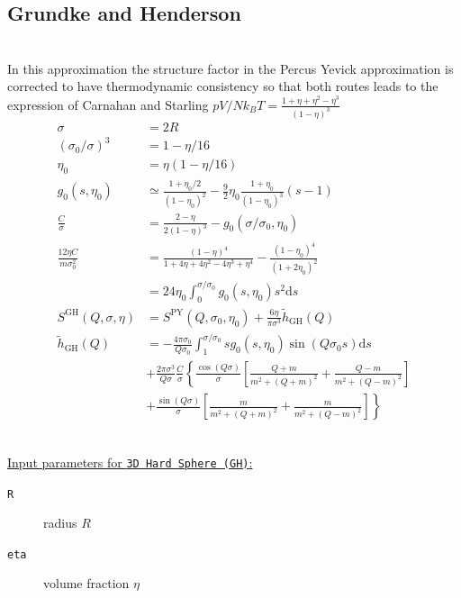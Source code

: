 \clearpage
\subsection{Grundke and Henderson} ~\\

\noindent In this approximation the structure factor in the Percus Yevick approximation is corrected to have thermodynamic consistency \cite{Henderson1975} so that both routes leads to the expression of Carnahan and Starling
$pV/Nk_BT=\frac{1+\eta+\eta^2-\eta^3}{\left(1-\eta\right)^3}$
\begin{align}
\sigma &= 2R\\
\left(\sigma_0/\sigma\right)^3 &= 1-\eta/16\\
\eta_0 &= \eta (1-\eta/16) \\
g_0(s,\eta_0) &\simeq \frac{1+\eta_0/2}{\left(1-\eta_0\right)^2} - \frac{9}{2}\eta_0\frac{1+\eta_0}{\left(1-\eta_0\right)^3}(s-1) \\
\frac{C}{\sigma} &= \frac{2-\eta}{2(1-\eta)^3} - g_0(\sigma/\sigma_0,\eta_0) \\
\frac{12\eta C}{m\sigma_0^2} &= \frac{(1-\eta)^4}{1+4\eta+4\eta^2-4\eta^3+\eta^4} - \frac{(1-\eta_0)^4}{(1+2\eta_0)^2} \nonumber \\
&= 24\eta_0\int_0^{\sigma/\sigma_0} g_0(s,\eta_0)s^2 \mathrm{d}s \\
S^\mathrm{GH}(Q,\sigma,\eta) &= S^\mathrm{PY}(Q,\sigma_0,\eta_0) + \frac{6\eta}{\pi\sigma^3}\tilde{h}_\mathrm{GH}(Q) \\
\tilde{h}_\mathrm{GH}(Q)  &= -\frac{4\pi\sigma_0}{Q\sigma_0} \int_1^{\sigma/\sigma_0} sg_0(s,\eta_0)\sin(Q\sigma_0 s)\mathrm{d}s\\
&+ \frac{2\pi\sigma^3}{Q\sigma}\frac{C}{\sigma} \left\{ \frac{\cos (Q\sigma)}{\sigma}\left[\frac{Q+m}{m^2+(Q+m)^2}+\frac{Q-m}{m^2+(Q-m)^2}\right]\right.\nonumber \\
& + \left. \frac{\sin (Q\sigma)}{\sigma}\left[\frac{m}{m^2+(Q+m)^2}+\frac{m}{m^2+(Q-m)^2}\right]\right\}\nonumber
\end{align}

\vspace{5mm}

\hspace{1pt}\\
\uline{Input parameters for \texttt{3D Hard Sphere (GH)}:}
\begin{description}
    \item[\texttt{R}]  radius $R$
    \item[\texttt{eta}] volume fraction $\eta$
\end{description}

